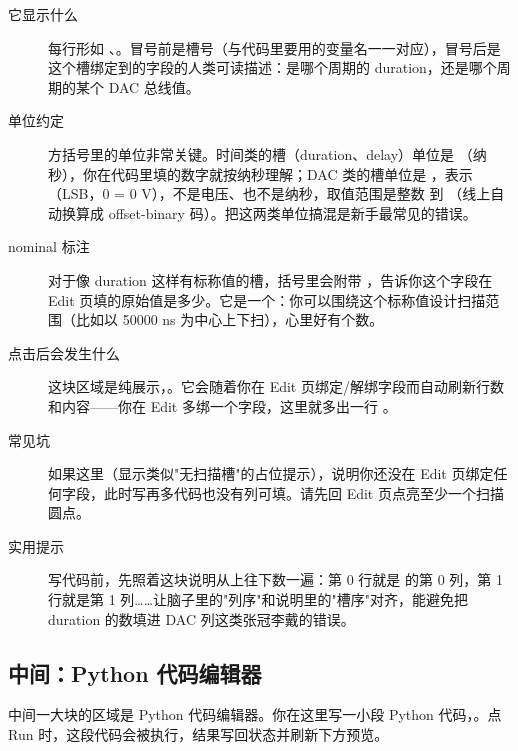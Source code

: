 \documentclass[11pt,oneside,openany]{book}
\begin{document}
\begin{description}
\item[它显示什么] 每行形如 、。冒号前是槽号（与代码里要用的变量名一一对应），冒号后是这个槽绑定到的字段的人类可读描述：是哪个周期的 duration，还是哪个周期的某个 DAC 总线值。
\item[单位约定] 方括号里的单位非常关键。时间类的槽（duration、delay）单位是 \pyapi{[ns]}（纳秒），你在代码里填的数字就按纳秒理解；DAC 类的槽单位是 \pyapi{[value]}，表示（LSB，0 = 0 V），不是电压、也不是纳秒，取值范围是整数  到 （线上自动换算成 offset-binary 码）。把这两类单位搞混是新手最常见的错误。
\item[nominal 标注] 对于像 duration 这样有标称值的槽，括号里会附带 ，告诉你这个字段在 Edit 页填的原始值是多少。它是一个：你可以围绕这个标称值设计扫描范围（比如以 50000 ns 为中心上下扫），心里好有个数。
\item[点击后会发生什么] 这块区域是纯展示，。它会随着你在 Edit 页绑定/解绑字段而自动刷新行数和内容——你在 Edit 多绑一个字段，这里就多出一行 。
\item[常见坑] 如果这里（显示类似"无扫描槽"的占位提示），说明你还没在 Edit 页绑定任何字段，此时写再多代码也没有列可填。请先回 Edit 页点亮至少一个扫描圆点。
\item[实用提示] 写代码前，先照着这块说明从上往下数一遍：第 0 行就是  的第 0 列，第 1 行就是第 1 列……让脑子里的"列序"和说明里的"槽序"对齐，能避免把 duration 的数填进 DAC 列这类张冠李戴的错误。
\end{description}

\subsection{中间：Python 代码编辑器}

中间一大块的区域是 Python 代码编辑器。你在这里写一小段 Python 代码，。点 Run 时，这段代码会被执行，结果写回状态并刷新下方预览。
\end{document}
